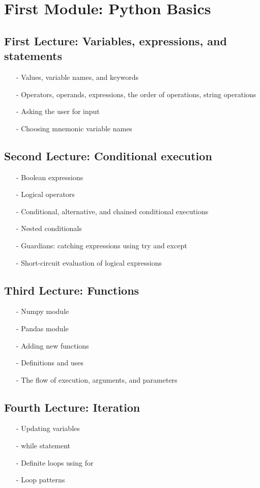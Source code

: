 \documentclass[12pt]{article}
\begin{document}
\section*{First Module: Python Basics}

\subsection*{First Lecture: Variables, expressions, and statements}
\begin{itemize}
\item[-]	Values, variable names, and keywords
\item[-]	Operators, operands, expressions, the order of operations, string operations
\item[-]	Asking the user for input
\item[-]	Choosing mnemonic variable names
\end{itemize}

\subsection*{Second Lecture: Conditional execution}
\begin{itemize}
\item[-]	Boolean expressions
\item[-]	Logical operators
\item[-]	Conditional, alternative, and chained conditional executions
\item[-]	Nested conditionals
\item[-]	Guardians: catching expressions using try and except
\item[-]	Short-circuit evaluation of logical expressions
\end{itemize}

\subsection*{Third Lecture: Functions}
\begin{itemize}
\item[-]	Numpy module
\item[-]	Pandas module
\item[-]   Adding new functions
\item[-]	Definitions and uses
\item[-]	The flow of execution, arguments, and parameters
\end{itemize}

\subsection*{Fourth Lecture: Iteration}
\begin{itemize}
\item[-]	Updating variables
\item[-]	while statement
\item[-]	Definite loops using for
\item[-]	Loop patterns
\end{itemize}
\end{document}
